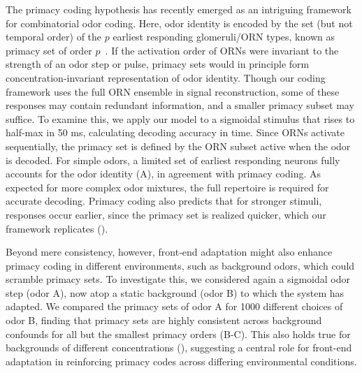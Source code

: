 \documentclass[9pt,lineno]{elife}
\begin{document}
The primacy coding hypothesis has recently emerged as an intriguing framework for combinatorial odor coding. Here, odor identity is encoded by the set (but not temporal order) of the $p$ earliest responding glomeruli/ORN types, known as primacy set of order $p$~\citep{primacy_coding}. If the activation order of ORNs were invariant to the strength of an odor step or pulse, primacy sets would in principle form concentration-invariant representation of odor identity. Though our coding framework uses the full ORN ensemble in signal reconstruction, some of these responses may contain redundant information, and a smaller primacy subset may suffice. To examine this, we apply our model to a sigmoidal stimulus that rises to half-max in 50 ms, calculating decoding accuracy in time. Since ORNs activate sequentially, the primacy set is defined by the ORN subset active when the odor is decoded. For simple odors, a limited set of earliest responding neurons fully accounts for the odor identity (A), in agreement with primacy coding. As expected for more complex odor mixtures, the full repertoire is required for accurate decoding. Primacy coding also predicts that for stronger stimuli, responses occur earlier, since the primacy set is realized quicker, which our framework replicates ().

Beyond mere consistency, however, front-end adaptation might also enhance primacy coding in different environments, such as background odors, which could scramble primacy sets. To investigate this, we considered again a sigmoidal odor step (odor A), now atop a static background (odor B) to which the system has adapted. We compared the primacy sets of odor A for 1000 different choices of odor B, finding that primacy sets are highly consistent across background confounds for all but the smallest primacy orders (B-C). This also holds true for backgrounds of different concentrations (), suggesting a central role for front-end adaptation in reinforcing primacy codes across differing environmental conditions. 
\end{document}
